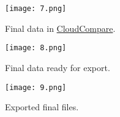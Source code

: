 \begin{figure}
	\centering
	\texttt{[image: 7.png]}
	\caption{Final data in \href{https://www.cloudcompare.org/}{CloudCompare}.}
	\label{fig:7}
\end{figure}

\begin{figure}
	\centering
	\texttt{[image: 8.png]}
	\caption{Final data ready for export.}
	\label{fig:8}
\end{figure}

\begin{figure}
	\centering
	\texttt{[image: 9.png]}
	\caption{Exported final files.}
	\label{fig:9}
\end{figure}